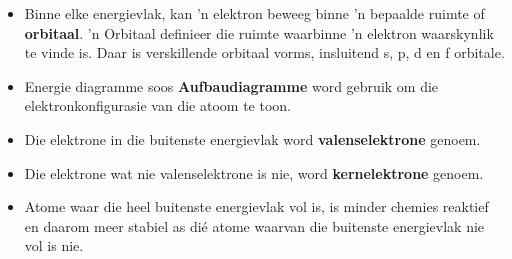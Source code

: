 \begin{itemize}[noitemsep]
\item Binne elke energievlak, kan 'n elektron beweeg binne 'n bepaalde ruimte of \textbf{orbitaal}. 'n Orbitaal definieer die ruimte waarbinne 'n elektron waarskynlik te vinde is. Daar is verskillende orbitaal vorms, insluitend s, p, d en f orbitale.
\item Energie diagramme soos \textbf{Aufbaudiagramme} word gebruik om die elektronkonfigurasie van die atoom te toon.
\item Die elektrone in die buitenste energievlak word \textbf{valenselektrone} genoem.
\item Die elektrone wat nie valenselektrone is nie, word \textbf{kernelektrone} genoem.
\item Atome waar die heel buitenste energievlak vol is, is minder chemies reaktief en daarom meer stabiel as dié atome waarvan die buitenste energievlak nie vol is nie.
\end{itemize}

     
            

